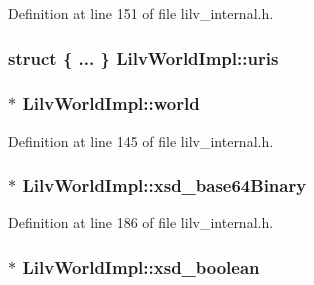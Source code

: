 Definition at line 151 of file lilv\+\_\+internal.\+h.

\subsubsection[{\texorpdfstring{uris}{uris}}]{\setlength{\rightskip}{0pt plus 5cm}struct \{ ... \}   Lilv\+World\+Impl\+::uris}\hypertarget{struct_lilv_world_impl_a24b83785b1723099aabccb42c697954e}{}\label{struct_lilv_world_impl_a24b83785b1723099aabccb42c697954e}
\subsubsection[{\texorpdfstring{world}{world}}]{$\ast$ Lilv\+World\+Impl\+::world}\hypertarget{struct_lilv_world_impl_a568e68967d35a64821393e5015e826cf}{}\label{struct_lilv_world_impl_a568e68967d35a64821393e5015e826cf}


Definition at line 145 of file lilv\+\_\+internal.\+h.

\subsubsection[{\texorpdfstring{xsd\+\_\+base64\+Binary}{xsd_base64Binary}}]{$\ast$ Lilv\+World\+Impl\+::xsd\+\_\+base64\+Binary}\hypertarget{struct_lilv_world_impl_a20f9af8d69aec67c7cf0b81cd03fe9d5}{}\label{struct_lilv_world_impl_a20f9af8d69aec67c7cf0b81cd03fe9d5}


Definition at line 186 of file lilv\+\_\+internal.\+h.

\subsubsection[{\texorpdfstring{xsd\+\_\+boolean}{xsd_boolean}}]{$\ast$ Lilv\+World\+Impl\+::xsd\+\_\+boolean}\hypertarget{struct_lilv_world_impl_af728f79030739f922a368b303da14205}{}\label{struct_lilv_world_impl_af728f79030739f922a368b303da14205}


